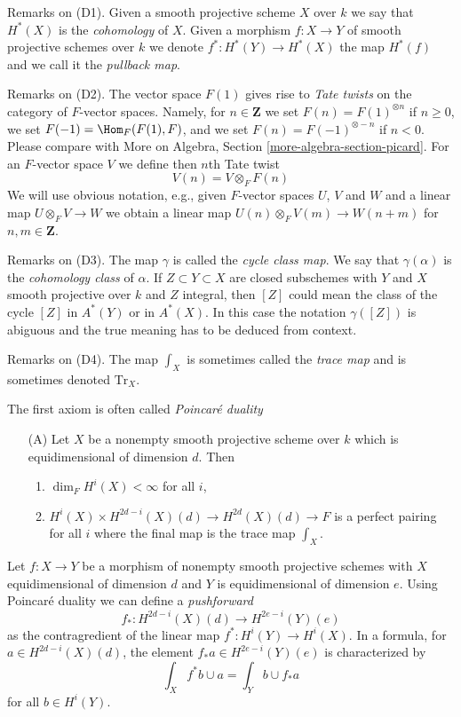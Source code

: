 \medskip\noindent
Remarks on (D1).
Given a smooth projective scheme $X$ over $k$ we say that $H^*(X)$
is the {\it cohomology} of $X$. Given a morphism $f : X \to Y$
of smooth projective schemes over $k$ we denote $f^* : H^*(Y) \to H^*(X)$
the map $H^*(f)$ and we call it the {\it pullback map}.

\medskip\noindent
Remarks on (D2).
The vector space $F(1)$ gives rise to {\it Tate twists} on the category of
$F$-vector spaces. Namely, for $n \in \mathbf{Z}$ we set
$F(n) = F(1)^{\otimes n}$ if $n \geq 0$, we set $F(-1) = \Hom_F(F(1), F)$,
and we set $F(n) = F(-1)^{\otimes - n}$ if $n < 0$. Please compare
with More on Algebra, Section \ref{more-algebra-section-picard}.
For an $F$-vector space $V$ we define then $n$th Tate twist
$$
V(n) = V \otimes_F F(n)
$$
We will use obvious notation, e.g., given $F$-vector spaces $U$, $V$
and $W$ and a linear map $U \otimes_F V \to W$ we obtain a linear
map $U(n) \otimes_F V(m) \to W(n + m)$ for $n, m \in \mathbf{Z}$.

\medskip\noindent
Remarks on (D3). The map $\gamma$ is called the {\it cycle class map}.
We say that $\gamma(\alpha)$ is the {\it cohomology class} of $\alpha$.
If $Z \subset Y \subset X$ are closed subschemes with $Y$ and $X$
smooth projective over $k$ and $Z$ integral, then $[Z]$ could
mean the class of the cycle $[Z]$ in $A^*(Y)$ or in $A^*(X)$.
In this case the notation $\gamma([Z])$ is abiguous and the true meaning
has to be deduced from context.

\medskip\noindent
Remarks on (D4). The map $\int_X$ is sometimes called the
{\it trace map} and is sometimes denoted $\text{Tr}_X$.

\medskip\noindent
The first axiom is often called {\it Poincar\'e duality}
\begin{enumerate}
\item[(A)] Let $X$ be a nonempty smooth projective scheme over $k$
which is equidimensional of dimension $d$. Then
\begin{enumerate}
\item $\dim_F H^i(X) < \infty$ for all $i$,
\item $H^i(X) \times H^{2d - i}(X)(d) \rightarrow
H^{2d}(X)(d) \rightarrow F$
is a perfect pairing for all $i$ where the final
map is the trace map $\int_X$.
\end{enumerate}
\end{enumerate}
Let $f : X \to Y$ be a morphism of nonempty smooth projective schemes with $X$
equidimensional of dimension $d$ and $Y$ is equidimensional of dimension $e$.
Using Poincar\'e duality we can define a {\it pushforward}
$$
f_* : H^{2d - i}(X)(d) \longrightarrow H^{2e - i}(Y)(e)
$$
as the contragredient of the linear map $f^* : H^i(Y) \to H^i(X)$. In a
formula, for $a \in H^{2d - i}(X)(d)$, the element $f_*a \in H^{2e - i}(Y)(e)$
is characterized by
$$
\int_X f^*b \cup a = \int_Y b \cup f_*a
$$
for all $b \in H^i(Y)$.

